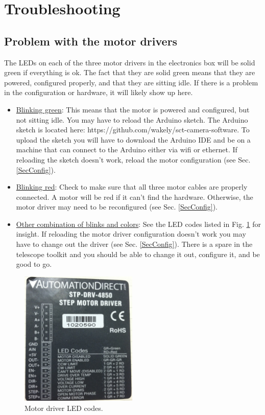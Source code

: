 \documentclass[11pt]{article}
\begin{document}
\section{Troubleshooting}

\subsection{Problem with the motor drivers}

The LEDs on each of the three motor drivers in the electronics box will be solid green if everything is ok.
The fact that they are solid green means that they are powered, configured properly, and that they are sitting idle.  
If there is a problem in the configuration or hardware, it will likely show up here.

\begin{itemize}
	\item \underline{Blinking green}:  This means that the motor is powered and configured, but not sitting idle.  
		You may have to reload the Arduino sketch.
		The Arduino sketch is located here: https://github.com/wakely/sct-camera-software.  
		To upload the sketch you will have to download the Arduino IDE and be on a machine that can connect to the Arduino either via wifi or ethernet.
		If reloading the sketch doesn't work, reload the motor configuration (see Sec. \ref{SecConfig}).
 	\item \underline{Blinking red}:  Check to make sure that all three motor cables are properly connected.  
		A motor will be red if it can't find the hardware.  Otherwise, the motor driver may need to be reconfigured (see Sec. \ref{SecConfig}).
	\item \underline{Other combination of blinks and colors}:  See the LED codes listed in Fig. \ref{ledCodes} for insight.
	 	If reloading the motor driver configuration doesn't work you may have to change out the driver (see Sec. \ref{SecConfig}).  
		There is a spare in the telescope toolkit and you should be able to change it out, configure it, and be good to go.
\end{itemize}

\begin{figure}[h]
\begin{center}
\includegraphics[width = 2.2in]{photoLedCodes.JPG}
\caption{Motor driver LED codes.}  
\label{ledCodes}
\end{center}
\end{figure}
\end{document}

